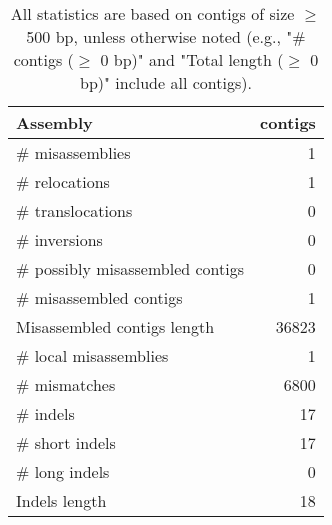 \documentclass[12pt,a4paper]{article}
\begin{document}
\begin{table}[ht]
\begin{center}
\caption{All statistics are based on contigs of size $\geq$ 500 bp, unless otherwise noted (e.g., "\# contigs ($\geq$ 0 bp)" and "Total length ($\geq$ 0 bp)" include all contigs).}
\begin{tabular}{|l*{1}{|r}|}
\hline
Assembly & contigs \\ \hline
\# misassemblies & 1 \\ \hline
\hspace{5mm}\# relocations & 1 \\ \hline
\hspace{5mm}\# translocations & 0 \\ \hline
\hspace{5mm}\# inversions & 0 \\ \hline
\# possibly misassembled contigs & 0 \\ \hline
\# misassembled contigs & 1 \\ \hline
Misassembled contigs length & 36823 \\ \hline
\# local misassemblies & 1 \\ \hline
\# mismatches & 6800 \\ \hline
\# indels & 17 \\ \hline
\hspace{5mm}\# short indels & 17 \\ \hline
\hspace{5mm}\# long indels & 0 \\ \hline
Indels length & 18 \\ \hline
\end{tabular}
\end{center}
\end{table}
\end{document}
